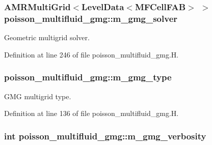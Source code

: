 \subsubsection[{\texorpdfstring{m\+\_\+gmg\+\_\+solver}{m_gmg_solver}}]{\setlength{\rightskip}{0pt plus 5cm}A\+M\+R\+Multi\+Grid$<$Level\+Data$<$M\+F\+Cell\+F\+AB$>$ $>$ poisson\+\_\+multifluid\+\_\+gmg\+::m\+\_\+gmg\+\_\+solver\hspace{0.3cm}{\ttfamily [protected]}}\hypertarget{classpoisson__multifluid__gmg_a95792ebbba23fe15b0b24fb858d999f6}{}\label{classpoisson__multifluid__gmg_a95792ebbba23fe15b0b24fb858d999f6}


Geometric multigrid solver. 



Definition at line 246 of file poisson\+\_\+multifluid\+\_\+gmg.\+H.

\subsubsection[{\texorpdfstring{m\+\_\+gmg\+\_\+type}{m_gmg_type}}]{ poisson\+\_\+multifluid\+\_\+gmg\+::m\+\_\+gmg\+\_\+type\hspace{0.3cm}{\ttfamily [protected]}}\hypertarget{classpoisson__multifluid__gmg_a8157c7d2d4166f7c936e896a0fd2a63c}{}\label{classpoisson__multifluid__gmg_a8157c7d2d4166f7c936e896a0fd2a63c}


G\+MG multigrid type. 



Definition at line 136 of file poisson\+\_\+multifluid\+\_\+gmg.\+H.

\subsubsection[{\texorpdfstring{m\+\_\+gmg\+\_\+verbosity}{m_gmg_verbosity}}]{\setlength{\rightskip}{0pt plus 5cm}int poisson\+\_\+multifluid\+\_\+gmg\+::m\+\_\+gmg\+\_\+verbosity\hspace{0.3cm}{\ttfamily [protected]}}\hypertarget{classpoisson__multifluid__gmg_a95b6677094d33585fda164a7195c531d}{}\label{classpoisson__multifluid__gmg_a95b6677094d33585fda164a7195c531d}



